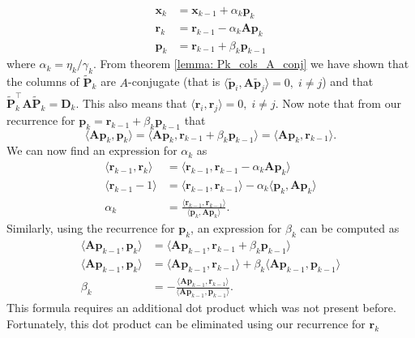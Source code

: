 \begin{align*}
    \bm{x}_k & = \bm{x}_{k-1} + \alpha_k \bm{p}_k        \\
    \bm{r}_k & = \bm{r}_{k-1} - \alpha_k \bm{A} \bm{p}_k \\
    \bm{p}_k & = \bm{r}_{k-1} + \beta_k \bm{p}_{k-1}
\end{align*}
where $\alpha_k = \eta_k / \gamma_k$. From theorem \ref{lemma: Pk_cols_A_conj} we have shown that the columns of $\tilde{\bm{P}}_k$ are $A$-conjugate (that is $\langle \tilde{\bm{p}}_i , \bm{A} \tilde{\bm{p}}_j \rangle = 0, \; i \neq j$) and that $\tilde{\bm{P}}_k^{\intercal} \bm{A} \tilde{\bm{P}}_k = \bm{D}_k$. This also means that $\langle \bm{r}_i , \bm{r}_j \rangle = 0, \; i \neq j$. Now note that from our recurrence for $\bm{p}_k = \bm{r}_{k-1} + \beta_k \bm{p}_{k-1}$ that
\[
    \langle \bm{A} \bm{p}_k ,\bm{p}_k \rangle = \langle \bm{A} \bm{p}_k , \bm{r}_{k-1} + \beta_k \bm{p}_{k-1} \rangle = \langle \bm{A} \bm{p}_k , \bm{r}_{k-1} \rangle.
\]
We can now find an expression for $\alpha_k$ as
\begin{align*}
    \langle \bm{r}_{k-1} , \bm{r}_{k} \rangle & = \langle \bm{r}_{k-1} , \bm{r}_{k-1} - \alpha_k \bm{A} \bm{p}_k \rangle                           \\
    \langle \bm{r}_{k-1} -1 \rangle           & = \langle \bm{r}_{k-1} , \bm{r}_{k-1} \rangle - \alpha_k \langle \bm{p}_k, \bm{A} \bm{p}_k \rangle \\
    \alpha_k                                  & = \frac{\langle \bm{r}_{k-1} , \bm{r}_{k-1} \rangle}{\langle \bm{p}_k, \bm{A} \bm{p}_k \rangle}.
\end{align*}
Similarly, using the recurrence for $\bm{p}_k$, an expression for $\beta_k$ can be computed as
\begin{align*}
    \langle \bm{A} \bm{p}_{k-1} , \bm{p}_k \rangle & = \langle \bm{A} \bm{p}_{k-1}, \bm{r}_{k-1} + \beta_k \bm{p}_{k-1} \rangle                                       \\
    \langle \bm{A} \bm{p}_{k-1} , \bm{p}_k \rangle & = \langle \bm{A} \bm{p}_{k-1}, \bm{r}_{k-1} \rangle + \beta_k \langle \bm{A} \bm{p}_{k-1}, \bm{p}_{k-1} \rangle  \\
    \beta_k                                        & = - \frac{\langle \bm{A} \bm{p}_{k-1}, \bm{r}_{k-1} \rangle}{\langle \bm{A} \bm{p}_{k-1}, \bm{p}_{k-1} \rangle}.
\end{align*}
This formula requires an additional dot product which was not present before. Fortunately, this dot product can be eliminated using our recurrence for $\bm{r}_k$

